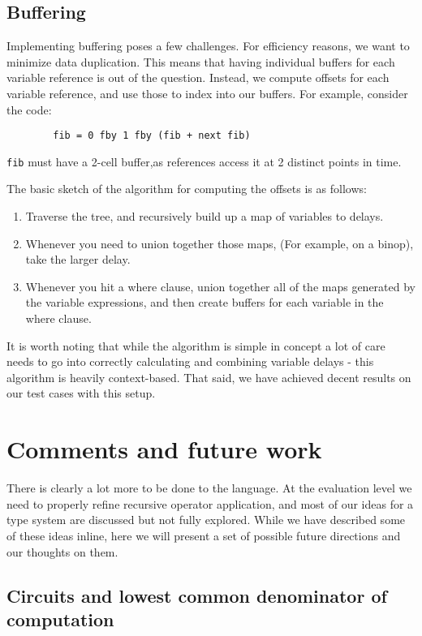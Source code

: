 \documentclass{scrartcl}
\begin{document}
    \subsection{Buffering}
    Implementing buffering poses a few challenges. For efficiency reasons, we want to minimize data duplication.
    This means that having individual buffers for each variable reference is out of the question. Instead, we compute
    offsets for each variable reference, and use those to index into our buffers. For example, consider the code:
    \begin{lstlisting}
        fib = 0 fby 1 fby (fib + next fib)
    \end{lstlisting}
    \lstinline{fib} must have a 2-cell buffer,as references access it at 2 distinct points in time.

    The basic sketch of the algorithm for computing the offsets is as follows:
    \begin{enumerate}
        \item Traverse the tree, and recursively build up a map of variables to delays.
        \item Whenever you need to union together those maps, (For example, on a binop), take the 
            larger delay.
        \item Whenever you hit a where clause, union together all of the maps generated by the variable
            expressions, and then create buffers for each variable in the where clause.
    \end{enumerate}

    It is worth noting that while the algorithm is simple in concept a lot of care needs to go into correctly calculating and combining variable delays - this algorithm is heavily context-based. That said, we have achieved decent results on our test cases with this setup.


    \section{Comments and future work}
    
    There is clearly a lot more to be done to the language. At the evaluation level we need to properly refine recursive operator application, and most of our ideas for a type system are discussed but not fully explored. While we have described some of these ideas inline, here we will present a set of possible future directions and our thoughts on them.
    
    \subsection{Circuits and lowest common denominator of computation}
    
\end{document}
